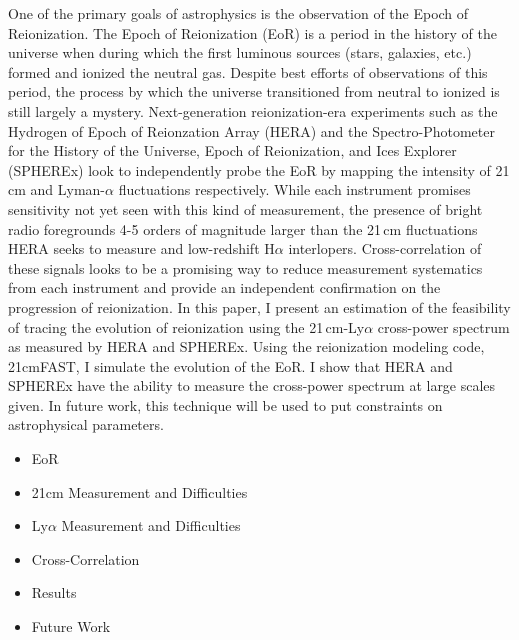 One of the primary goals of astrophysics is the observation of the Epoch of Reionization.
The Epoch of Reionization (EoR) is a period in the history of the universe when during
which the first luminous sources (stars, galaxies, etc.) formed and ionized the neutral gas.
Despite best efforts of observations of this period, the process by which the universe
transitioned from neutral to ionized is still largely a mystery. Next-generation reionization-era
experiments such as the Hydrogen of Epoch of Reionzation Array (HERA) and the Spectro-Photometer
for the History of the Universe, Epoch of Reionization, and Ices Explorer (SPHEREx)
look to independently probe the EoR by mapping the intensity of 21\,cm and Lyman-$\alpha$
fluctuations respectively. While each instrument promises sensitivity not yet seen
with this kind of measurement, the presence of bright radio foregrounds 4-5 orders of
magnitude larger than the 21\,cm fluctuations HERA seeks to measure and low-redshift H$\alpha$
interlopers. Cross-correlation of these signals looks to be a promising way to reduce
measurement systematics from each instrument and provide an independent confirmation
on the progression of reionization. In this paper, I present an estimation of the
feasibility of tracing the evolution of reionization using the 21\,cm-Ly$\alpha$
cross-power spectrum as measured by HERA and SPHEREx. Using the reionization modeling
code, 21cmFAST, I simulate the evolution of the EoR. I show that HERA and SPHEREx have
the ability to measure the cross-power spectrum at large scales given. In future work,
this technique will be used to put constraints on astrophysical parameters.


\begin{itemize}
\item EoR
\item 21cm Measurement and Difficulties
\item Ly$\alpha$ Measurement and Difficulties
\item Cross-Correlation
\item Results
\item Future Work
\end{itemize}

\newpage
